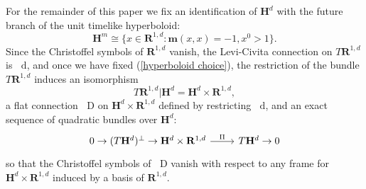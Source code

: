 \documentclass[reqno,12pt,letterpaper]{amsart}
\newcommand{\RR}{\mathbf{R}}
\newcommand{\Hyp}{\mathbf H}
\newcommand{\Mink}{\mathbf m}
\newcommand*\dif{\mathop{}\!\mathrm{d}}
\newcommand*\Dif{\mathop{}\!\mathrm{D}}
\newcommand{\dfn}[1]{\emph{#1}\index{#1}}
\theoremstyle{definition}
\newtheorem{definition}[theorem]{Definition}
\numberwithin{equation}{section}
\begin{document}
For the remainder of this paper we fix an identification of $\Hyp^d$ with the future branch of the unit timelike hyperboloid:
\begin{equation}\label{hyperboloid choice}
\Hyp^m \cong \{x \in \RR^{1,d}: \Mink(x, x) = -1, x^0 > 1\}.
\end{equation}
Since the Christoffel symbols of $\RR^{1,d}$ vanish, the Levi-Civita connection on $T\RR^{1, d}$ is $\dif$, and once we have fixed (\ref{hyperboloid choice}), the restriction of the bundle $T\RR^{1, d}$ induces an isomorphism
$$T\RR^{1, d}|\Hyp^d = \Hyp^d \times \RR^{1, d},$$
a flat connection $\Dif$ on $\Hyp^d \times \RR^{1, d}$ defined by restricting $\dif$, and an exact sequence of quadratic bundles over $\Hyp^d$:
$$\begin{tikzcd}
0 \to (T\Hyp^d)^\perp \to \Hyp^d \times \RR^{1, d} \arrow[r,"\Pi"] & T\Hyp^d \to 0
\end{tikzcd}$$
so that the Christoffel symbols of $\Dif$ vanish with respect to any frame for $\Hyp^d \times \RR^{1, d}$ induced by a basis of $\RR^{1, d}$.
%
%
%
%
\end{document}
